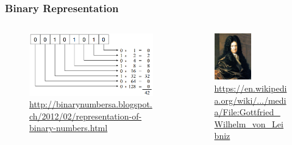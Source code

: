 \documentclass{beamer}
\begin{document}
\begin{frame}\frametitle{Binary Representation} 
\begin{columns}
\begin{column}{6cm}
\begin{figure}
\includegraphics[width=1\textwidth]{binary.png}%
\caption{\url{http://binarynumbersa.blogspot.ch/2012/02/representation-of-binary-numbers.html}}%
\end{figure}
\end{column}
\begin{column}{6cm}
\begin{figure}
\includegraphics[width=0.5\textwidth]{leibniz}%
\caption{\url{https://en.wikipedia.org/wiki/.../media/File:Gottfried_Wilhelm_von_Leibniz}}%
\end{figure}
\end{column}
\end{columns}
\end{frame}
\end{document}
